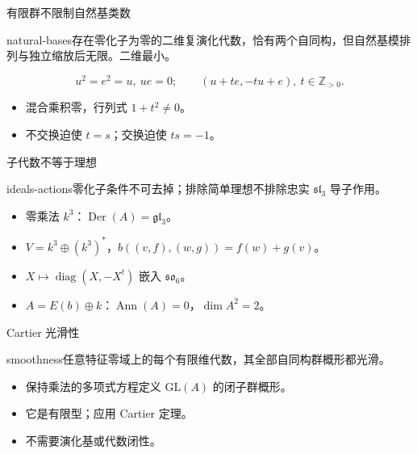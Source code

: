 \documentclass{beamer}
\begin{document}
\begin{frame}{有限群不限制自然基类数}
\begin{bookresult}{natural-bases}存在零化子为零的二维复演化代数，恰有两个自同构，但自然基模排列与独立缩放后无限。二维最小。\end{bookresult}\[u^2=e^2=u,\ ue=0;\qquad (u+te,-tu+e),\ t\in\mathbb Z_{>0}.\]\begin{itemize}\item 混合乘积零，行列式 $1+t^2\ne0$。\item 不交换迫使 $t=s$；交换迫使 $ts=-1$。\end{itemize}
\end{frame}
\begin{frame}{子代数不等于理想}
\begin{bookresult}{ideals-actions}零化子条件不可去掉；排除简单理想不排除忠实 $\mathfrak{sl}_3$ 导子作用。\end{bookresult}\begin{itemize}\item 零乘法 $k^3$：$\operatorname{Der}(A)=\mathfrak{gl}_3$。\item $V=k^3\oplus(k^3)^*$，$b((v,f),(w,g))=f(w)+g(v)$。\item $X\mapsto\operatorname{diag}(X,-X^t)$ 嵌入 $\mathfrak{so}_6$。\item $A=E(b)\oplus k$：$\operatorname{Ann}(A)=0$，$\dim A^2=2$。\end{itemize}
\end{frame}
\begin{frame}{Cartier 光滑性}
\begin{bookresult}{smoothness}任意特征零域上的每个有限维代数，其全部自同构群概形都光滑。\end{bookresult}\begin{itemize}\item 保持乘法的多项式方程定义 $\mathrm{GL}(A)$ 的闭子群概形。\item 它是有限型；应用 Cartier 定理。\item 不需要演化基或代数闭性。\end{itemize}
\end{frame}
\FormalVerification
\end{document}
